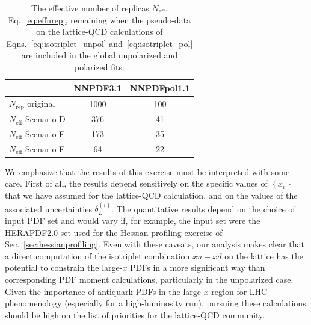 \begin{table}[!t]
\centering
\footnotesize
\renewcommand{\arraystretch}{1.3} 
\begin{tabular}{lcc}
\toprule
&  NNPDF3.1  &  NNPDFpol1.1 \\
\midrule
$N_\text{rep}$ original   & 1000 & 100 \\
$N_\text{eff}$ Scenario D &  376 &  41 \\
$N_\text{eff}$ Scenario E &  173 &  35 \\
$N_\text{eff}$ Scenario F &  64  &  22 \\
\bottomrule
\end{tabular}
\caption{\small The effective number of replicas
  $N_\text{eff}$, Eq.~\eqref{eq:effnrep}, remaining when the pseudo-data
  on the lattice-QCD calculations
  of Eqns.~\eqref{eq:isotriplet_unpol}
  and~\eqref{eq:isotriplet_pol} 
  are included in the global
  unpolarized and polarized fits. 
  \label{tab:neffxspace}
  }
\end{table}

We emphasize that the results of this exercise must be interpreted
with some care.
%
First of all, the results depend sensitively on the specific values of
$\left\{ x_i \right\}$
that we have assumed for the lattice-QCD calculation,
and on the values
of the associated uncertainties $\delta_L^{(i)}$.
%
The quantitative results depend on the choice of input PDF set and would 
vary if, for example, the input set were the HERAPDF2.0 set used for the 
Hessian profiling exercise of Sec.~\ref{sec:hessianprofiling}.
%
Even with these caveats, our analysis makes clear that a direct
computation of the isotriplet combination $x u-x d$ on the lattice
has the potential to constrain the large-$x$ PDFs in
a more significant way than corresponding PDF moment calculations,
particularly in the unpolarized case.
%
Given the importance of antiquark PDFs in the large-$x$ region for LHC 
phenomenology (especially for a high-luminosity run), 
pursuing these calculations should be high on the list
of priorities for the lattice-QCD community.


